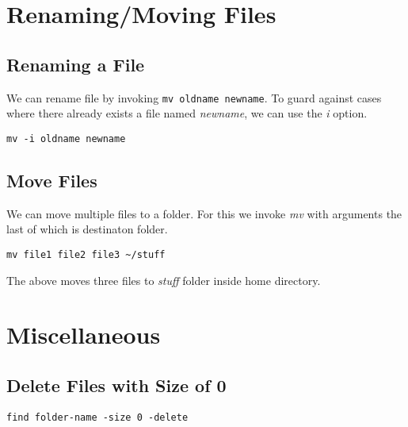 \documentclass[a4paper, 12pt]{article}
\begin{document}
\section{Renaming/Moving Files}
\subsection{Renaming a File}
We can rename file by invoking \verb|mv oldname newname|.
To guard against cases where there already exists a file named \emph{newname}, we can use the \emph{i} option.
\begin{verbatim}
mv -i oldname newname
\end{verbatim}
\subsection{Move Files}
We can move multiple files to a folder. For this we invoke \emph{mv} with arguments the last of which is destinaton folder.
\begin{verbatim}
mv file1 file2 file3 ~/stuff
\end{verbatim}
The above moves three files to \emph{stuff} folder inside home directory.

\section{Miscellaneous}

\subsection{Delete Files with Size of 0}
\verb|find folder-name -size 0 -delete|
\end{document}
